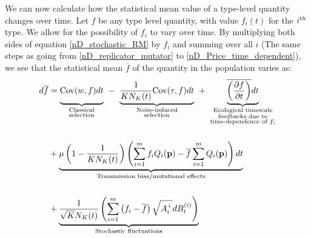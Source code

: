 We can now calculate how the statistical mean value of a type-level quantity changes over time. Let $f$ be any type level quantity, with value $f_i(t)$ for the $i\textsuperscript{th}$ type. We allow for the possibility of $f_i$ to vary over time. By multiplying both sides of
equation \eqref{nD_stochastic_RM} by $f_i$ and summing over all $i$ (The same steps as going from \eqref{nD_replicator_mutator} to \eqref{nD_Price_time_dependent}), we see that the statistical mean $\overline{f}$ of the quantity in the population varies as:
\begin{equation}
\label{nD_stochastic_Price}
\begin{aligned}
d\overline{f} &= {\underbrace{\vphantom{ \frac{1}{KN_K(t)} }\textrm{Cov}(w,f)dt}_{\substack{\text{Classical} \\ \text{selection}}}} \ - \ {\underbrace{\frac{1}{KN_K(t)}\textrm{Cov}(\tau,f)dt}_{\substack{\text{Noise-induced} \\ \text{selection}}}} \ +  \  {\underbrace{\vphantom{ \frac{1}{KN_K(t)} }\overline{\left(\frac{\partial f}{\partial t}\right)}dt}_{\substack{\text{Ecological timescale} \\ \text{feedbacks due to} \\ \text{time-dependence of $f_i$}}}}\\[15pt]
&+ \underbrace{\mu\left(1-\frac{1}{KN_K(t)}\right)\left(\sum\limits_{i=1}^{m}f_iQ_i(\mathbf{p}) - \overline{f}\sum\limits_{i=1}^{m}Q_i(\mathbf{p})\right)dt}_{\text{Transmission bias/mutational effects}}\\[15pt]
&+ \underbrace{\frac{1}{\sqrt{K}N_{K}(t)}\left(\sum\limits_{i=1}^{m}\left(f_i-\overline{f}\right)\sqrt{A_i^+}dB_{t}^{(i)}\right)}_{\text{Stochastic fluctuations}}
\end{aligned} 
\end{equation}
